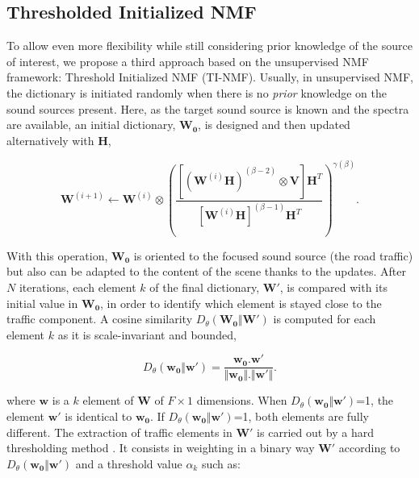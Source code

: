 \documentclass[review,5p,twocolumn,sort&compress,times]{elsarticle}
\begin{document}
\subsection{Thresholded Initialized NMF}\label{part:NMF_TI}

To allow even more flexibility while still considering prior knowledge of the source of interest, we propose a third approach based on the unsupervised NMF framework: Threshold Initialized NMF (TI-NMF). Usually, in unsupervised NMF, the dictionary is initiated randomly when there is no \textit{prior} knowledge on the sound sources present. Here, as the target sound source is known and the spectra are available, an initial dictionary, $\mathbf{W_0}$, is designed and then updated alternatively with $\mathbf{H}$,

\begin{equation}\label{eq:updateW_unsup}
\textbf{W}^{(i+1)} \leftarrow \mathbf{W}^{(i)}\otimes \left(\frac{\left[\left(\mathbf{W}^{(i)}\mathbf{H} \right)^{(\beta-2)}\otimes \mathbf{V} \right]\mathbf{H}^T}{\left[\mathbf{W}^{(i)}\mathbf{H} \right]^{(\beta-1)}\mathbf{H}^T}\right)^{\gamma(\beta)}.
\end{equation}

With this operation, $\mathbf{W_0}$ is oriented to the focused sound source (the road traffic) but also can be adapted to the content of the scene thanks to the updates. After $N$ iterations, each element $k$ of the final dictionary, $\mathbf{W'}$, is compared with its initial value in $\mathbf{W_0}$, in order to identify which element is stayed close to the traffic component. A cosine similarity $D_{\theta}\left(\mathbf{W_0} \Vert \mathbf{W'} \right)$ is computed for each element $k$ as it is scale-invariant and bounded,

\begin{equation}
D_{\theta}\left(\mathbf{w_0} \Vert \mathbf{w'} \right) = \frac{\mathbf{w_0}.\mathbf{w'}}{\Vert \mathbf{w_0}  \Vert . \Vert \mathbf{w'} \Vert}.
\end{equation}

where $\mathbf{w}$ is a $k$ element of $\mathbf{W}$ of $F \times 1$ dimensions. When $D_{\theta}\left(\mathbf{w_0} \Vert \mathbf{w'} \right)$=1, the element $\mathbf{w'}$ is identical to $\mathbf{w_0}$. If $D_{\theta}\left(\mathbf{w_0} \Vert \mathbf{w'} \right)$=1, both elements are fully different. The extraction of traffic elements in $\mathbf{W'}$ is carried out by a hard thresholding method \cite{donoho1994threshold}. It consists in weighting in a binary way $\mathbf{W'}$ according to $D_{\theta}\left(\mathbf{w_0} \Vert \mathbf{w'} \right)$ and a threshold value $\alpha_k$ such as:
\end{document}
